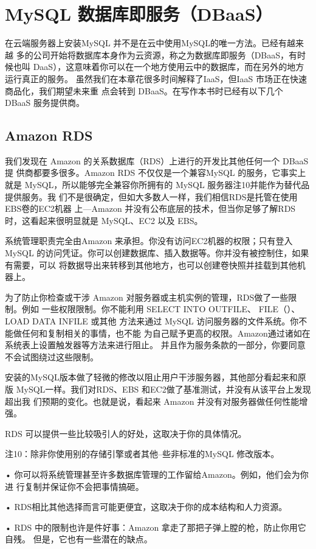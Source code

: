 \section{MySQL 数据库即服务（DBaaS）}
在云端服务器上安装MySQL 并不是在云中使用MySQL的唯一方法。已经有越来越
多的公司开始将数据库本身作为云资源，称之为数据库即服务（DBaaS，有时候也叫
DaaS），这意味着你可以在一个地方使用云中的数据库，而在另外的地方运行真正的服务。
虽然我们在本章花很多时间解释了IaaS，但IaaS 市场正在快速商品化，我们期望未来重
点会转到 DBaaS。在写作本书时已经有以下几个 DBaaS 服务提供商。

\subsection{Amazon RDS}
我们发现在 Amazon 的关系数据库（RDS）上进行的开发比其他任何一个 DBaaS 提
供商都要多很多。Amazon RDS 不仅仅是一个兼容MySQL 的服务，它事实上就是
MySQL，所以能够完全兼容你所拥有的 MySQL 服务器注10并能作为替代品提供服务。我
们不是很确定，但如大多数人一样，我们相信RDS是托管在使用EBS卷的EC2机器
上—Amazon 并没有公布底层的技术，但当你足够了解RDS时，这看起来很明显就是
MySQL、EC2 以及 EBS。

系统管理职责完全由Amazon 来承担。你没有访问EC2机器的权限；只有登入MySQL
的访问凭证。你可以创建数据库、插入数据等。你并没有被控制住，如果有需要，可以
将数据导出来转移到其他地方，也可以创建卷快照并挂载到其他机器上。

为了防止你检查或干涉 Amazon 对服务器或主机实例的管理，RDS做了一些限制。例如
一些权限限制。你不能利用 SELECT INTO OUTFILE、 FILE（）、LOAD DATA INFILE 或其他
方法来通过 MySQL 访问服务器的文件系统。你不能做任何和复制相关的事情，也不能
为自己赋予更高的权限。Amazon通过诸如在系统表上设置触发器等方法来进行阻止。
并且作为服务条款的一部分，你要同意不会试图绕过这些限制。

安装的MySQL版本做了轻微的修改以阻止用户干涉服务器，其他部分看起来和原版
MySQL一样。我们对RDS、EBS 和EC2做了基准测试，并没有从该平台上发现超出我
们预期的变化。也就是说，看起来 Amazon 并没有对服务器做任何性能增强。

RDS 可以提供一些比较吸引人的好处，这取决于你的具体情况。

注10：除非你使用别的存储引擎或者其他--些非标准的MySQL 修改版本。

• 你可以将系统管理甚至许多数据库管理的工作留给Amazon。例如，他们会为你进
行复制并保证你不会把事情搞砸。

• RDS相比其他选择而言可能更便宜，这取决于你的成本结构和人力资源。

• RDS 中的限制也许是件好事：Amazon 拿走了那把子弹上膛的枪，防止你用它自残。
但是，它也有一些潜在的缺点。

